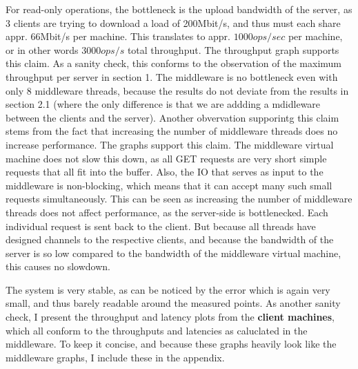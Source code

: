 \documentclass[11pt,a4paper]{article}
\begin{document}
For read-only operations, the bottleneck is the upload bandwidth of the server,
as 3 clients are trying to download a load of 200Mbit/s, and thus must each share appr. 66Mbit/s per machine.
This translates to appr. $1000 ops/sec$ per machine, or in other words $3000ops/s$ total throughput.
The throughput graph supports this claim.
As a sanity check, this conforms to the observation of the maximum throughput per server in section 1.
The middleware is no bottleneck even with only 8 middleware threads, because the results do not deviate from the results in section 2.1 (where the only difference is that we are addding a mdidleware between the clients and the server).
Another obvervation supporintg this claim stems from the fact that increasing the number of middleware threads does no increase performance.
The graphs support this claim.
The middleware virtual machine does not slow this down, as all GET requests are very short simple requests that all fit into the buffer.
Also, the IO that serves as input to the middleware is non-blocking, which means that it can accept many such small requests simultaneously.
This can be seen as increasing the number of middleware threads does not affect performance, as the server-side is bottlenecked.
Each individual request is sent back to the client. 
But because all threads have designed channels to the respective clients, and because the bandwidth of the server is so low compared to the bandwidth of the middleware virtual machine, this causes no slowdown.

The system is very stable, as can be noticed by the error which is again very small, and thus barely readable around the measured points.
As another sanity check, I present the throughput and latency plots from the \textbf{client machines}, which all conform to the throughputs and latencies as caluclated in the middleware.
To keep it concise, and because these graphs heavily look like the middleware graphs, I include these in the appendix. 
\end{document}
